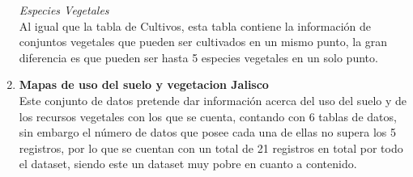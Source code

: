 \documentclass[10pt,letterpaper]{article}
\begin{document}
\begin{enumerate}
\textit{Especies Vegetales}\\
Al igual que la tabla de Cultivos, esta tabla contiene la informaci\'on de conjuntos vegetales que pueden ser cultivados en un mismo punto, la gran diferencia es que pueden ser hasta 5 especies vegetales en un solo punto.

\item \textbf{Mapas de uso del suelo y vegetacion Jalisco}\\
Este conjunto de datos pretende dar informaci\'on acerca del uso del suelo y de los recursos vegetales con los que se cuenta, contando con 6 tablas de datos, sin embargo el n\'umero de datos que posee cada una de ellas no supera los 5 registros, por lo que se cuentan con un total de 21 registros en total por todo el dataset, siendo este un dataset muy pobre en cuanto a contenido.
\end{enumerate}
\end{document}
